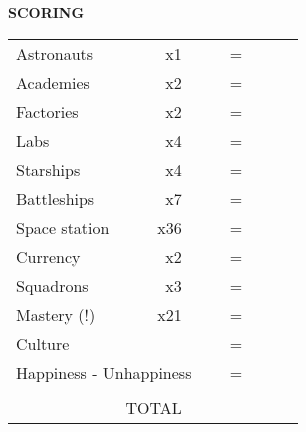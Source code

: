 \begin{flushleft}
  \textbf{SCORING}
\end{flushleft}
\begin{tabular}{lrllrlll}
Astronauts       & x1                   &           &  & =                     &  &                       &  \\ \cline{3-4} \cline{6-7}
Academies       & x2                   &           &  & =                     &  &                       &  \\ \cline{3-4} \cline{6-7}
Factories       & x2                   &           &  & =                     &  &                       &  \\ \cline{3-4} \cline{6-7}
Labs             & x4                   &           &  & =                     &  &                       &  \\ \cline{3-4} \cline{6-7}
Starships   & x4                   &           &  & =                     &  &                       &  \\ \cline{3-4} \cline{6-7}
Battleships    & x7                   &           &  & =                     &  &                       &  \\ \cline{3-4} \cline{6-7}
Space station      & x36                  &           &  & =                     &  &                       &  \\ \cline{3-4} \cline{6-7}
Currency  & x2                   &           &  & =                     &  &                       &  \\ \cline{3-4} \cline{6-7}
Squadrons      & x3                   &           &  & =                     &  &                       &  \\ \cline{3-4} \cline{6-7}
Mastery (!) & x21                  &           &  & =                     &  &                       &  \\ \cline{3-4} \cline{6-7}
Culture &  &  &  & =                     &  &                       &  \\ \cline{6-7}
\multicolumn{4}{l}{Happiness - Unhappiness}       & =                     &  &                       &  \\ \cline{6-7}
            & \multicolumn{1}{l}{} &           &  & \multicolumn{1}{l}{}  &  &                       &  \\ \cline{6-7}
            & TOTAL                & \textbf{} &  & \multicolumn{1}{r|}{} &  & \multicolumn{1}{l|}{} &  \\ \cline{6-7}
\end{tabular}
